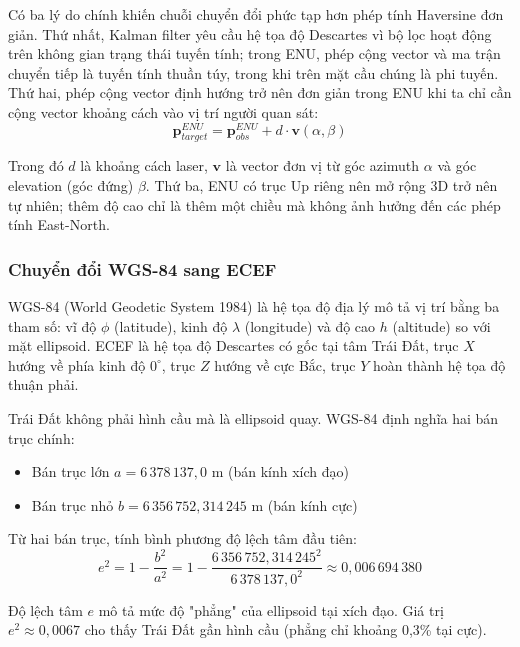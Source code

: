 Có ba lý do chính khiến chuỗi chuyển đổi phức tạp hơn phép tính Haversine đơn giản. Thứ nhất, Kalman filter yêu cầu hệ tọa độ Descartes vì bộ lọc hoạt động trên không gian trạng thái tuyến tính; trong ENU, phép cộng vector và ma trận chuyển tiếp là tuyến tính thuần túy, trong khi trên mặt cầu chúng là phi tuyến. Thứ hai, phép cộng vector định hướng trở nên đơn giản trong ENU khi ta chỉ cần cộng vector khoảng cách vào vị trí người quan sát:
\begin{equation}
    \mathbf{p}_{target}^{ENU} = \mathbf{p}_{obs}^{ENU} + d \cdot \mathbf{v}(\alpha, \beta)
\end{equation}

Trong đó $d$ là khoảng cách laser, $\mathbf{v}$ là vector đơn vị từ góc azimuth $\alpha$ và góc elevation (góc đứng) $\beta$. Thứ ba, ENU có trục Up riêng nên mở rộng 3D trở nên tự nhiên; thêm độ cao chỉ là thêm một chiều mà không ảnh hưởng đến các phép tính East-North.

\subsubsection{Chuyển đổi WGS-84 sang ECEF}

\hspace{0.5cm} WGS-84 (World Geodetic System 1984) là hệ tọa độ địa lý mô tả vị trí bằng ba tham số: vĩ độ $\phi$ (latitude), kinh độ $\lambda$ (longitude) và độ cao $h$ (altitude) so với mặt ellipsoid. ECEF là hệ tọa độ Descartes có gốc tại tâm Trái Đất, trục $X$ hướng về phía kinh độ $0^\circ$, trục $Z$ hướng về cực Bắc, trục $Y$ hoàn thành hệ tọa độ thuận phải.

Trái Đất không phải hình cầu mà là ellipsoid quay. WGS-84 định nghĩa hai bán trục chính:
\begin{itemize}
    \item Bán trục lớn $a = 6\,378\,137{,}0$ m (bán kính xích đạo)
    \item Bán trục nhỏ $b = 6\,356\,752{,}314\,245$ m (bán kính cực)
\end{itemize}

Từ hai bán trục, tính bình phương độ lệch tâm đầu tiên:
\begin{equation}
    e^2 = 1 - \frac{b^2}{a^2} = 1 - \frac{6\,356\,752{,}314\,245^2}{6\,378\,137{,}0^2} \approx 0{,}006\,694\,380
\end{equation}

Độ lệch tâm $e$ mô tả mức độ "phẳng" của ellipsoid tại xích đạo. Giá trị $e^2 \approx 0{,}0067$ cho thấy Trái Đất gần hình cầu (phẳng chỉ khoảng 0,3\% tại cực).

